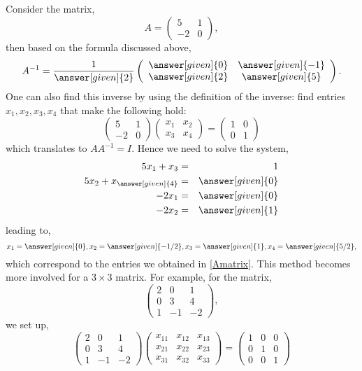 \documentclass{ximera}
\begin{document}
Consider the matrix,
\[
A= \left(\begin{array}{cc}
  5 &  1 \\
  -2 &  0
\end{array}\right),
\]
then based on the formula discussed above,
\begin{equation}\label{Amatrix}
A^{-1}= \frac{1}{\answer[given]{2}} \left(\begin{array}{cc}
  \answer[given]{0} &  \answer[given]{-1} \\
  \answer[given]{2} &  \answer[given]{5}
\end{array}\right).
\end{equation}
One can also find this inverse by using the definition of the inverse: find entries $x_{1}, x_{2}, x_{3}, x_{4}$ that make the following hold:
\[
\left(\begin{array}{cc}
  5 &  1 \\
  -2 &  0
\end{array}\right) \left(\begin{array}{cc}
  x_{1} &  x_{2} \\
  x_{3} &  x_{4}
\end{array}\right)= \left(\begin{array}{cc}
  1 &  0 \\
  0 &  1
\end{array}\right)
\]
which translates to $AA^{-1}=I$. Hence we need to solve the system,
\begin{eqnarray*}
5x_{1}+x_{3}&=&1\\
5x_{2} + x_{\answer[given]{4}} &=& \answer[given]{0}\\
-2x_{1}&=& \answer[given]{0}\\
-2x_{2} &=& \answer[given]{1}
\end{eqnarray*}
leading to,
\begin{equation*}
x_{1} = \answer[given]{0}, x_{2} =\answer[given]{-1/2}, x_{3} = \answer[given]{1}, x_{4} = \answer[given]{5/2},
\end{equation*}
which correspond to the entries we obtained in \eqref{Amatrix}. This method becomes more involved for a $3\times 3$ matrix. For example, for the matrix,
\[
\left(\begin{array}{ccc}
  2 &  0 & 1 \\
  0 &  3 & 4 \\
  1 & -1 & -2
\end{array}\right),
\]
 we set up,
 \[
\left(\begin{array}{ccc}
  2 &  0 & 1 \\
  0 &  3 & 4 \\
  1 & -1 & -2
\end{array}\right) \left(\begin{array}{ccc}
  x_{11} &  x_{12} & x_{13} \\
 x_{21} &  x_{22} & x_{23} \\
  x_{31} &  x_{32} & x_{33}
\end{array}\right)
= \left(\begin{array}{ccc}
  1 &  0 & 0 \\
  0 &  1 & 0 \\
  0 & 0 & 1
\end{array}\right)
\]
\end{document}

